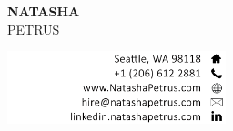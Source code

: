 \documentclass[letterpage]{article}
\begin{document}
\thispagestyle{empty} %
\begin{minipage}[]{0.4\linewidth}
\raggedright
\textbf{\fontsize{37px}{1px}\selectfont\textsf{NATASHA}}\\
\vspace{7px}
{\fontsize{37px}{1px}\selectfont\textsf{PETRUS}}
\end{minipage}
\begin{minipage}{0.01\linewidth}
\end{minipage}
\:\:\:\:\:\:\:\:\:\:\:\:\:\:\:\:\:\: %
\begin{minipage}{0.55\linewidth}
\raggedleft
\vspace{5px} %
\includegraphics[width=2.5in]
{contact.png}
\end{minipage}
\vspace{11px}\\
\end{document}
